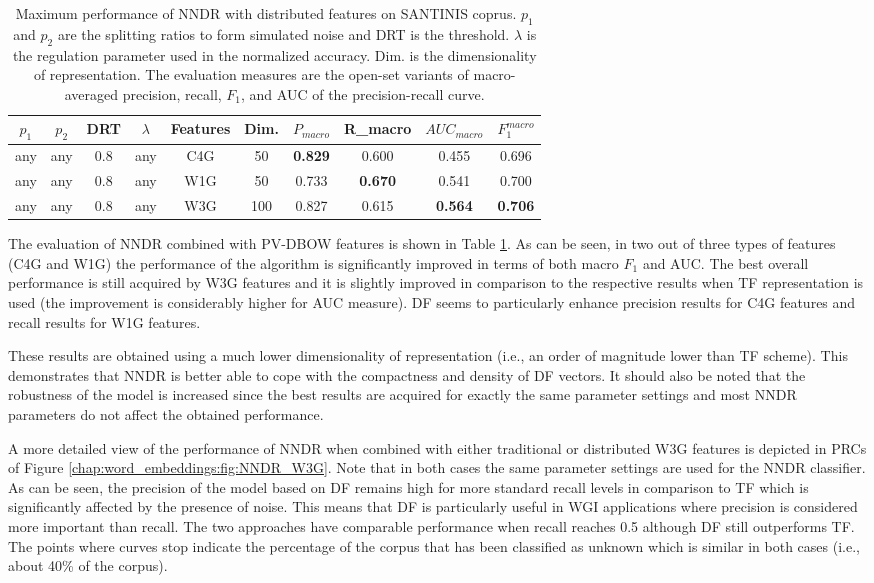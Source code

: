 \begin{table}
\center
\begin{tabular}{cccccccccc}
\hline
$p_1$ & $p_2$ & DRT & $\lambda$ & Features & Dim. & $P_{macro}$ & R_{macro} & $AUC_{macro}$ & $F_1^{macro}$ \\
\hline
any & any & 0.8 & any & C4G & 50 & \textbf{0.829} & 0.600 & 0.455 & 0.696 \\
any & any & 0.8 & any & W1G & 50 & 0.733 & \textbf{0.670} & 0.541 & 0.700 \\
any & any & 0.8 & any & W3G & 100 & 0.827 & 0.615 & \textbf{0.564} & \textbf{0.706} \\
\hline
\end{tabular}
\caption {Maximum performance of NNDR with distributed features on SANTINIS coprus. $p_1$ and $p_2$ are the splitting ratios to form simulated noise and DRT is the threshold. $\lambda$ is the regulation parameter used in the normalized accuracy. Dim. is the dimensionality of representation. The evaluation measures are the open-set variants of macro-averaged precision, recall, $F_1$, and AUC of the precision-recall curve.}
\label{chap:word_embeddings:tbl:NNDR_PVBOW}
\end{table}

The evaluation of NNDR combined with PV-DBOW features is shown in Table \ref{chap:word_embeddings:tbl:NNDR_PVBOW}. As can be seen, in two out of three types of features (C4G and W1G) the performance of the algorithm is significantly improved in terms of both macro $F_1$ and AUC. The best overall performance is still acquired by W3G features and it is slightly improved in comparison to the respective results when TF representation is used (the improvement is considerably higher for AUC measure). DF seems to particularly enhance precision results for C4G features and recall results for W1G features. 

These results are obtained using a much lower dimensionality of representation (i.e., an order of magnitude lower than TF scheme). This demonstrates that NNDR is better able to cope with the compactness and density of DF vectors. It should also be noted that the robustness of the model is increased since the best results are acquired for exactly the same parameter settings and most NNDR parameters do not affect the obtained performance. 

A more detailed view of the performance of NNDR when combined with either traditional or distributed W3G features is depicted in PRCs of Figure  \ref{chap:word_embeddings:fig:NNDR_W3G}. Note that in both cases the same parameter settings are used for the NNDR classifier.  As can be seen, the precision of the model based on DF remains high for more standard recall levels in comparison to TF which is significantly affected by the presence of noise. This means that DF is particularly useful in WGI applications where precision is considered more important than recall. The two approaches have comparable performance when recall reaches 0.5 although DF still outperforms TF. The points where curves stop indicate the percentage of the corpus that has been classified as unknown which is similar in both cases (i.e., about 40\% of the corpus).

